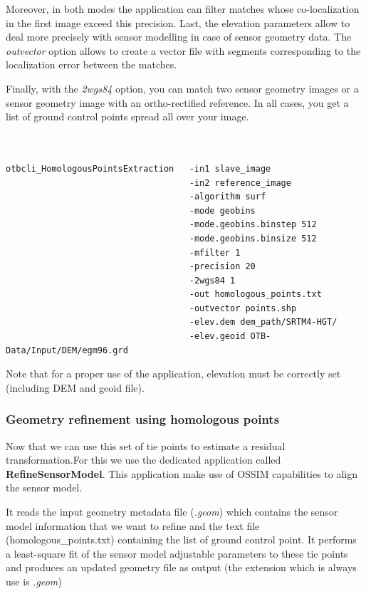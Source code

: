 Moreover, in both modes the application can filter matches whose co-localization in
the first image exceed this precision. Last, the elevation parameters allow to deal
more precisely with sensor modelling in case of sensor geometry data. The
\textit{outvector} option allows to create a vector file with segments
corresponding to the localization error between the matches.

Finally, with the \textit{2wgs84} option, you can match two sensor geometry images or a
sensor geometry image with an ortho-rectified reference. In all cases, you get
a list of ground control points spread all over your image.

\begin{verbatim}


otbcli_HomologousPointsExtraction   -in1 slave_image
                                    -in2 reference_image
                                    -algorithm surf
                                    -mode geobins
                                    -mode.geobins.binstep 512
                                    -mode.geobins.binsize 512
                                    -mfilter 1
                                    -precision 20
                                    -2wgs84 1
                                    -out homologous_points.txt
                                    -outvector points.shp
                                    -elev.dem dem_path/SRTM4-HGT/
                                    -elev.geoid OTB-Data/Input/DEM/egm96.grd

\end{verbatim}

Note that for a proper use of the application, elevation must be correctly set
(including DEM and geoid file).

\subsubsection{Geometry refinement using homologous points}

Now that we can use this set of tie points to estimate a residual
transformation.For this we use the dedicated application called
\textbf{RefineSensorModel}. This application make use of OSSIM capabilities to
align the sensor model.

It reads the input geometry metadata file (\textit{.geom}) which contains the
sensor model information that we want to refine and the text file
(homologous\_points.txt) containing the list of ground control point. It
performs a least-square fit of the sensor model adjustable parameters to these
tie points and produces an updated geometry file as output (the extension which
is always use is \textit{.geom})

